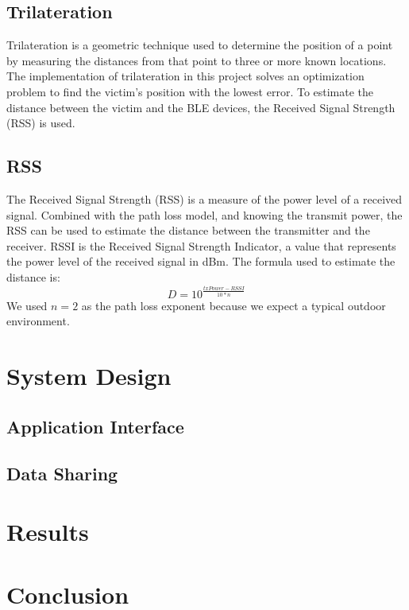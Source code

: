 \documentclass{article}
\begin{document}
\begin{multicols}{2}
\subsection{Trilateration}
Trilateration is a geometric technique 
used to determine the position of a point 
by measuring the distances from that point 
to three or more known locations.
The implementation of trilateration in this
project solves an optimization problem to find
the victim's position with the lowest error.
To estimate the distance between the victim and
the BLE devices, the Received Signal Strength
(RSS) is used.
\subsection{RSS}
The Received Signal Strength (RSS) is a measure
of the power level of a received signal. 
Combined with the path loss model, and knowing the
transmit power, the RSS can be used to estimate
the distance between the transmitter and the 
receiver.
RSSI is the Received Signal Strength Indicator,
a value that represents the power level of the
received signal in dBm.
The formula used to estimate the distance is:
\begin{equation}
    D=10^{\frac{txPower - RSSI}{10 * n}}
\end{equation}
We used $n=2$ as the path loss exponent because
we expect a typical outdoor environment.
\section{System Design}
\subsection{Application Interface}
\subsection{Data Sharing}
\section{Results}
\section{Conclusion}
\end{multicols}


\end{document}
